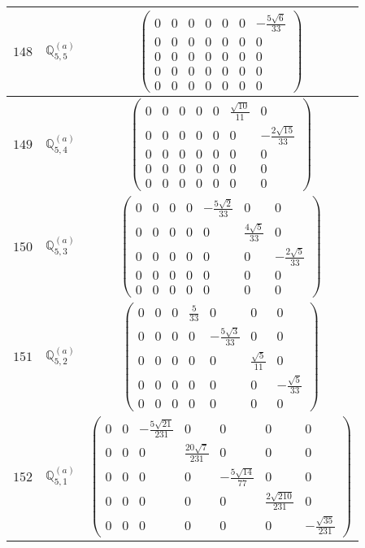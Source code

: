 \documentclass[fleqn,8pt,landscape]{jsarticle}
\begin{document}
\begin{center}
\begin{longtable}{ccc}
$ 148 $ & $ \mathbb{Q}_{5,5}^{(a)} $ & $ \begin{pmatrix} 0 & 0 & 0 & 0 & 0 & 0 & - \frac{5 \sqrt{6}}{33} \\ 0 & 0 & 0 & 0 & 0 & 0 & 0 \\ 0 & 0 & 0 & 0 & 0 & 0 & 0 \\ 0 & 0 & 0 & 0 & 0 & 0 & 0 \\ 0 & 0 & 0 & 0 & 0 & 0 & 0 \end{pmatrix} $ \\ \hline
$ 149 $ & $ \mathbb{Q}_{5,4}^{(a)} $ & $ \begin{pmatrix} 0 & 0 & 0 & 0 & 0 & \frac{\sqrt{10}}{11} & 0 \\ 0 & 0 & 0 & 0 & 0 & 0 & - \frac{2 \sqrt{15}}{33} \\ 0 & 0 & 0 & 0 & 0 & 0 & 0 \\ 0 & 0 & 0 & 0 & 0 & 0 & 0 \\ 0 & 0 & 0 & 0 & 0 & 0 & 0 \end{pmatrix} $ \\ \hline
$ 150 $ & $ \mathbb{Q}_{5,3}^{(a)} $ & $ \begin{pmatrix} 0 & 0 & 0 & 0 & - \frac{5 \sqrt{2}}{33} & 0 & 0 \\ 0 & 0 & 0 & 0 & 0 & \frac{4 \sqrt{5}}{33} & 0 \\ 0 & 0 & 0 & 0 & 0 & 0 & - \frac{2 \sqrt{5}}{33} \\ 0 & 0 & 0 & 0 & 0 & 0 & 0 \\ 0 & 0 & 0 & 0 & 0 & 0 & 0 \end{pmatrix} $ \\ \hline
$ 151 $ & $ \mathbb{Q}_{5,2}^{(a)} $ & $ \begin{pmatrix} 0 & 0 & 0 & \frac{5}{33} & 0 & 0 & 0 \\ 0 & 0 & 0 & 0 & - \frac{5 \sqrt{3}}{33} & 0 & 0 \\ 0 & 0 & 0 & 0 & 0 & \frac{\sqrt{5}}{11} & 0 \\ 0 & 0 & 0 & 0 & 0 & 0 & - \frac{\sqrt{5}}{33} \\ 0 & 0 & 0 & 0 & 0 & 0 & 0 \end{pmatrix} $ \\ \hline
$ 152 $ & $ \mathbb{Q}_{5,1}^{(a)} $ & $ \begin{pmatrix} 0 & 0 & - \frac{5 \sqrt{21}}{231} & 0 & 0 & 0 & 0 \\ 0 & 0 & 0 & \frac{20 \sqrt{7}}{231} & 0 & 0 & 0 \\ 0 & 0 & 0 & 0 & - \frac{5 \sqrt{14}}{77} & 0 & 0 \\ 0 & 0 & 0 & 0 & 0 & \frac{2 \sqrt{210}}{231} & 0 \\ 0 & 0 & 0 & 0 & 0 & 0 & - \frac{\sqrt{35}}{231} \end{pmatrix} $ \\ \hline

\end{longtable}
\end{center}
\end{document}
